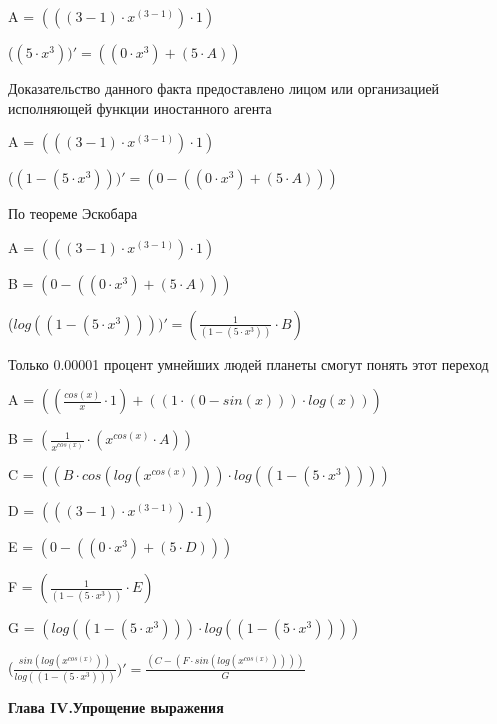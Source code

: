\documentclass[12pt,a4paper,fleqn]{article}
\begin{document}
\begin{center}
A = $(((3-1) \cdot x^{(3-1)}) \cdot 1)$\end{center}
\begin{center}
 ($(5 \cdot x^{3}))'
  = ((0 \cdot x^{3})+(5 \cdot A))$\end{center}
Доказательство данного факта предоставлено лицом или организацией исполняющей функции иностанного агента

\begin{center}
A = $(((3-1) \cdot x^{(3-1)}) \cdot 1)$\end{center}
\begin{center}
 ($(1-(5 \cdot x^{3})))'
  = (0-((0 \cdot x^{3})+(5 \cdot A)))$\end{center}
По теореме Эскобара

\begin{center}
A = $(((3-1) \cdot x^{(3-1)}) \cdot 1)$\end{center}
\begin{center}
B = $(0-((0 \cdot x^{3})+(5 \cdot A)))$\end{center}
\begin{center}
 ($log((1-(5 \cdot x^{3}))))'
  = (\frac{1}{(1-(5 \cdot x^{3}))} \cdot B)$\end{center}
Только 0.00001 процент умнейших людей планеты смогут понять этот переход

\begin{center}
A = $((\frac{cos(x)}{x} \cdot 1)+((1 \cdot (0-sin(x))) \cdot log(x)))$\end{center}
\begin{center}
B = $(\frac{1}{x^{cos(x)}} \cdot (x^{cos(x)} \cdot A))$\end{center}
\begin{center}
C = $((B \cdot cos(log(x^{cos(x)}))) \cdot log((1-(5 \cdot x^{3}))))$\end{center}
\begin{center}
D = $(((3-1) \cdot x^{(3-1)}) \cdot 1)$\end{center}
\begin{center}
E = $(0-((0 \cdot x^{3})+(5 \cdot D)))$\end{center}
\begin{center}
F = $(\frac{1}{(1-(5 \cdot x^{3}))} \cdot E)$\end{center}
\begin{center}
G = $(log((1-(5 \cdot x^{3}))) \cdot log((1-(5 \cdot x^{3}))))$\end{center}
\begin{center}
 ($\frac{sin(log(x^{cos(x)}))}{log((1-(5 \cdot x^{3})))})'
  = \frac{(C-(F \cdot sin(log(x^{cos(x)}))))}{G}$\end{center}
\newpage \textbf{\LARGE Глава IV.Упрощение выражения}
\end{document}
